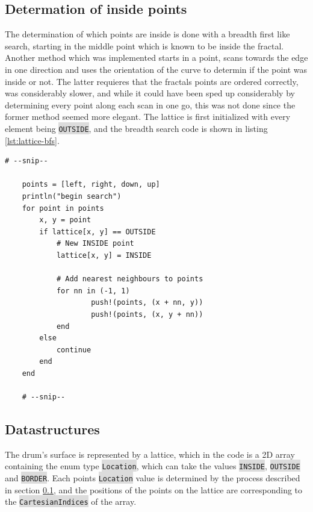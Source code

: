\documentclass{article}
\begin{document}
\subsection{Determation of inside points}\label{code:determine-inside}
The determination of which points are inside is done with a breadth first like search, starting in the middle point which is known to be inside the fractal. Another method which was implemented starts in a point, scans towards the edge in one direction and uses the orientation of the curve to determin if the point was inside or not. The latter requieres that the fractals points are ordered correctly, was considerably slower, and while it could have been sped up considerably by determining every point along each scan in one go, this was not done
since the former method seemed more elegant. The lattice is first initialized with every element being \colorbox{gainsboro}{\lstinline{OUTSIDE}}, and the breadth search code is shown in listing \ref{lst:lattice-bfs}.\\

\begin{lstlisting}[label=lst:lattice-bfs]
    # --snip--    

    points = [left, right, down, up] 
    println("begin search")
    for point in points
        x, y = point
        if lattice[x, y] == OUTSIDE
            # New INSIDE point
            lattice[x, y] = INSIDE

            # Add nearest neighbours to points
            for nn in (-1, 1)
                    push!(points, (x + nn, y)) 
                    push!(points, (x, y + nn))
            end
        else
            continue
        end
    end 

    # --snip--    
\end{lstlisting}

\subsection{Datastructures}
The drum's surface is represented by a lattice, which in the code is a 2D array containing the enum type \colorbox{gainsboro}{\lstinline{Location}}, which can take the values \colorbox{gainsboro}{\lstinline{INSIDE}}, \colorbox{gainsboro}{\lstinline{OUTSIDE}} and \colorbox{gainsboro}{\lstinline{BORDER}}. Each points \colorbox{gainsboro}{\lstinline{Location}} value is determined by the process described in section \ref{code:determine-inside}, and the positions of the
points on the lattice are corresponding to the \colorbox{gainsboro}{\lstinline{CartesianIndices}} of the array.
\end{document}
